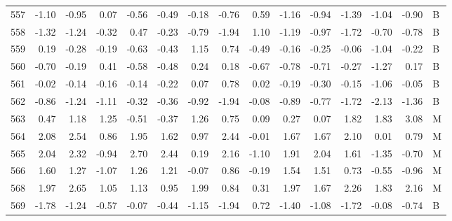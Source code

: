 \begin{table}[ht]
\begin{tabular}{rrrrrrrrrrrrrrl}
  557 & -1.10 & -0.95 & 0.07 & -0.56 & -0.49 & -0.18 & -0.76 & 0.59 & -1.16 & -0.94 & -1.39 & -1.04 & -0.90 & B \\ 
  558 & -1.32 & -1.24 & -0.32 & 0.47 & -0.23 & -0.79 & -1.94 & 1.10 & -1.19 & -0.97 & -1.72 & -0.70 & -0.78 & B \\ 
  559 & 0.19 & -0.28 & -0.19 & -0.63 & -0.43 & 1.15 & 0.74 & -0.49 & -0.16 & -0.25 & -0.06 & -1.04 & -0.22 & B \\ 
  560 & -0.70 & -0.19 & 0.41 & -0.58 & -0.48 & 0.24 & 0.18 & -0.67 & -0.78 & -0.71 & -0.27 & -1.27 & 0.17 & B \\ 
  561 & -0.02 & -0.14 & -0.16 & -0.14 & -0.22 & 0.07 & 0.78 & 0.02 & -0.19 & -0.30 & -0.15 & -1.06 & -0.05 & B \\ 
  562 & -0.86 & -1.24 & -1.11 & -0.32 & -0.36 & -0.92 & -1.94 & -0.08 & -0.89 & -0.77 & -1.72 & -2.13 & -1.36 & B \\ 
  563 & 0.47 & 1.18 & 1.25 & -0.51 & -0.37 & 1.26 & 0.75 & 0.09 & 0.27 & 0.07 & 1.82 & 1.83 & 3.08 & M \\ 
  564 & 2.08 & 2.54 & 0.86 & 1.95 & 1.62 & 0.97 & 2.44 & -0.01 & 1.67 & 1.67 & 2.10 & 0.01 & 0.79 & M \\ 
  565 & 2.04 & 2.32 & -0.94 & 2.70 & 2.44 & 0.19 & 2.16 & -1.10 & 1.91 & 2.04 & 1.61 & -1.35 & -0.70 & M \\ 
  566 & 1.60 & 1.27 & -1.07 & 1.26 & 1.21 & -0.07 & 0.86 & -0.19 & 1.54 & 1.51 & 0.73 & -0.55 & -0.96 & M \\ 
  568 & 1.97 & 2.65 & 1.05 & 1.13 & 0.95 & 1.99 & 0.84 & 0.31 & 1.97 & 1.67 & 2.26 & 1.83 & 2.16 & M \\ 
  569 & -1.78 & -1.24 & -0.57 & -0.07 & -0.44 & -1.15 & -1.94 & 0.72 & -1.40 & -1.08 & -1.72 & -0.08 & -0.74 & B \\ 
   \hline
\end{tabular}
\end{table}
